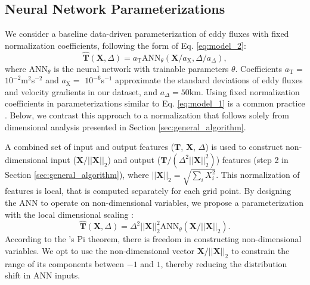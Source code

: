 \documentclass[draft]{agujournal2019}
\begin{document}
%

\subsection{Neural Network Parameterizations} \label{sec: eddy_param}

We consider a baseline data-driven parameterization of eddy fluxes with fixed normalization coefficients, following the form of Eq. \eqref{eq:model_2}:
\begin{equation}
\widehat{\mathbf{T}}(\mathbf{X}, \Delta) = a_{\mathrm{T}} \mathrm{ANN}_{\theta}(\mathbf{X} / a_{\mathrm{X}}, \Delta / a_{\Delta}), \label{eq:model_1}
\end{equation}
where $\mathrm{ANN}_{\theta}$ is the neural network with trainable parameters $\theta$. Coefficients $a_{\mathrm{T}}=$$10^{-2}$m$^2$s$^{-2}$ and $a_{\mathrm{X}}=$ $10^{-6}$s$^{-1}$ approximate the standard deviations of eddy fluxes and velocity gradients in our dataset, and $a_{\Delta}=50 \mathrm{km}$.
Using fixed normalization coefficients in parameterizations similar to Eq. \eqref{eq:model_1} is a common practice \cite{srinivasan2024turbulence}. Below, we contrast this approach to a normalization that follows solely from dimensional analysis presented in Section \ref{sec:general_algorithm}.


A combined set of input and output features ($\mathbf{T}$, $\mathbf{X}$, $\Delta$) is used to construct non-dimensional input ($\mathbf{X} / ||\mathbf{X}||_2$) and output ($\mathbf{T} / (\Delta^2 ||\mathbf{X}||_2^2)$) features (step 2 in Section \ref{sec:general_algorithm}), where $||\mathbf{X}||_2= \sqrt{\sum_i X_i^2}$. This normalization of features is local, that is computed separately for each grid point. By designing the ANN to operate on non-dimensional variables, we propose a parameterization with the local dimensional scaling \cite{reissmann2021application, prakash2022invariant}:
\begin{equation}
    \widehat{\mathbf{T}}(\mathbf{X}, \Delta) = \Delta^2 ||\mathbf{X}||_2^2 \mathrm{ANN}_{\theta} (\mathbf{X} / ||\mathbf{X}||_2). \label{eq:model_3}
\end{equation}
According to the 's Pi theorem, there is freedom in constructing non-dimensional variables. We opt to use the non-dimensional vector $\mathbf{X} / ||\mathbf{X}||_2$ to constrain the range of its components between $-1$ and $1$, thereby reducing the distribution shift in ANN inputs. 
\end{document}
